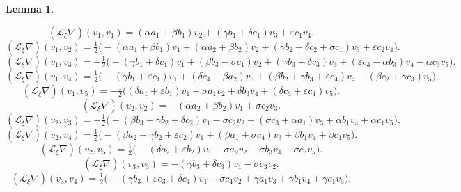 \documentclass[10pt]{article}
\newtheorem{Lemma}{Lemma}
\begin{document}
\begin{Lemma}
\begin{enumerate}
\begin{equation} 
(\mathscr{L}_\xi\nabla) (v_1,v_1)=(\alpha a_1+\beta b_1)v_2+(\gamma b_1+\delta c_1)v_3+\varepsilon c_1 v_4.\end{equation} 
\begin{equation}(\mathscr{L}_\xi\nabla) (v_1,v_2)=\tfrac{1}{2}\Big(-(\alpha a_1+\beta b_1)v_1+(\alpha a_2+\beta b_2)v_2+(\gamma b_2+\delta c_2+\sigma c_1)v_3+\varepsilon c_2 v_4\Big).\end{equation} 
\begin{equation}(\mathscr{L}_\xi\nabla) (v_1,v_3)=-\tfrac{1}{2}\Big(-(\gamma b_1+\delta c_1)v_1+(\beta b_3-\sigma c_1)v_2+(\gamma b_3+\delta c_3)v_3+(\varepsilon c_3-\alpha b_3) v_4-\alpha c_3v_5\Big).\end{equation}
\begin{equation}(\mathscr{L}_\xi\nabla) (v_1,v_4)=\tfrac{1}{2}\Big(-(\gamma b_1+\varepsilon c_1)v_1+(\delta c_4-\beta a_2)v_3+(\beta b_2 +\gamma b_3+\varepsilon c_4) v_4-(\beta c_2+\gamma c_3)v_5\Big).\end{equation}
\begin{equation}(\mathscr{L}_\xi\nabla) (v_1,v_5)=-\tfrac{1}{2}\Big((\delta a_1+\varepsilon b_1)v_1+\sigma a_1v_2+\delta b_3 v_4+(\delta c_3+\varepsilon c_4)v_5\Big).\end{equation} 
\begin{equation}(\mathscr{L}_\xi\nabla) (v_2,v_2)=-(\alpha a_2+\beta b_2)v_1+\sigma c_2 v_3.\end{equation}
\begin{equation}(\mathscr{L}_\xi\nabla) (v_2,v_3)=-\tfrac{1}{2}\Big(-(\beta b_3+\gamma b_2+\delta c_2)v_1-\sigma c_2v_2+(\sigma c_3+\alpha a_1)v_3+\alpha b_1 v_4+\alpha c_1v_5\Big).\end{equation} 
\begin{equation}(\mathscr{L}_\xi\nabla) (v_2,v_4)=\tfrac{1}{2}\Big(-(\beta a_2+\gamma b_2+\varepsilon c_2)v_1+(\beta a_1+\sigma c_4)v_3+\beta b_1 v_4+\beta c_1v_5\Big).\end{equation}
\begin{equation}(\mathscr{L}_\xi\nabla) (v_2,v_5)=\tfrac{1}{2}\Big(-(\delta a_2+\varepsilon b_2)v_1-\sigma a_2 v_2 -\sigma b_3 v_4-\sigma c_3v_5\Big).\end{equation}
\begin{equation}(\mathscr{L}_\xi\nabla) (v_3,v_3)=-(\gamma b_3+\delta c_3)v_1-\sigma c_3v_2.\label{A563}\end{equation}
\begin{equation}(\mathscr{L}_\xi\nabla) (v_3,v_4)=\tfrac{1}{2}\Big(-(\gamma b_3+\varepsilon c_3+\delta c_4 )v_1-\sigma c_4 v_2+\gamma a_1 v_3+\gamma b_1 v_4+\gamma c_1v_5\Big).\end{equation}

\end{enumerate}
\end{Lemma}
\end{document}
